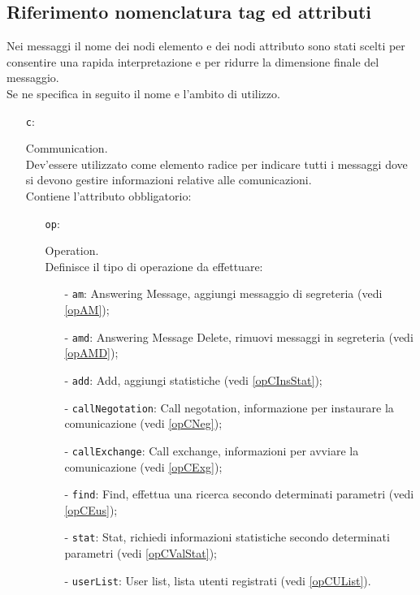 \subsection{Riferimento nomenclatura tag ed attributi}{
	Nei messaggi il nome dei nodi elemento e dei nodi attributo sono stati scelti per consentire una rapida interpretazione e per ridurre la dimensione finale del messaggio.\\
	Se ne specifica in seguito il nome e l'ambito di utilizzo.
	\begin{itemize}
		\item[] \texttt{c}:{ Communication.\\
		Dev'essere utilizzato come elemento radice per indicare tutti i messaggi dove si devono gestire informazioni relative alle comunicazioni.\\
		Contiene l'attributo obbligatorio:
		\begin{itemize}
			\item[] \texttt{op}:{ Operation.\\
			Definisce il tipo di operazione da effettuare:
				\begin{itemize}
					\item[-] \texttt{am}: Answering Message, aggiungi messaggio di segreteria (vedi \ref{opAM});
					\item[-] \texttt{amd}: Answering Message Delete, rimuovi messaggi in segreteria (vedi \ref{opAMD});
					\item[-] \texttt{add}: Add, aggiungi statistiche (vedi \ref{opCInsStat});
					\item[-] \texttt{callNegotation}: Call negotation, informazione per instaurare la comunicazione (vedi \ref{opCNeg});
					\item[-] \texttt{callExchange}: Call exchange, informazioni per avviare la comunicazione (vedi \ref{opCExg});
					\item[-] \texttt{find}: Find, effettua una ricerca secondo determinati parametri (vedi \ref{opCEus});
					\item[-] \texttt{stat}: Stat, richiedi informazioni statistiche secondo determinati parametri (vedi \ref{opCValStat});
					\item[-] \texttt{userList}: User list, lista utenti registrati (vedi \ref{opCUList}).
					

\end{itemize}}
\end{itemize}}
\end{itemize}}
